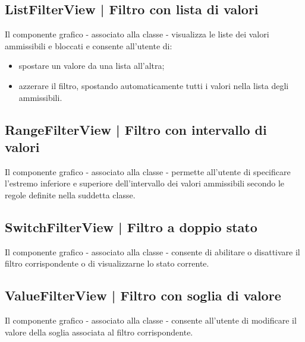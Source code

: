 \documentclass[10pt,a4paper,headinclude,footinclude,hidelinks]{scrreprt} %
\begin{document}
	\subsection[ListFilterView]{ListFilterView | Filtro con lista di valori}
	\label{sec:stage:design:sistema:view.filter:list-filter}
	Il componente grafico - associato alla classe \textit{} - visualizza le liste dei valori ammissibili e bloccati e consente all'utente di:
	\begin{itemize}
	\item spostare un valore da una lista all'altra;
	\item azzerare il filtro, spostando automaticamente tutti i valori nella lista degli ammissibili.
	\end{itemize}

	\subsection[RangeFilterView]{RangeFilterView | Filtro con intervallo di valori}
	\label{sec:stage:design:sistema:view.filter:range-filter}
	Il componente grafico - associato alla classe \textit{} - permette all'utente di specificare l'estremo inferiore e superiore dell'intervallo dei valori ammissibili secondo le regole definite nella suddetta classe.

	\subsection[SwitchFilterView]{SwitchFilterView | Filtro a doppio stato}
	\label{sec:stage:design:sistema:view.filter:switch-filter}
	Il componente grafico - associato alla classe \textit{} - consente di abilitare o disattivare il filtro corrispondente o di visualizzarne lo stato corrente.

	\subsection[ValueFilterView]{ValueFilterView | Filtro con soglia di valore}
	\label{sec:stage:design:sistema:view.filter:value-filter}
	Il componente grafico - associato alla classe \textit{} - consente all'utente di modificare il valore della soglia associata al filtro corrispondente.

\end{document}
